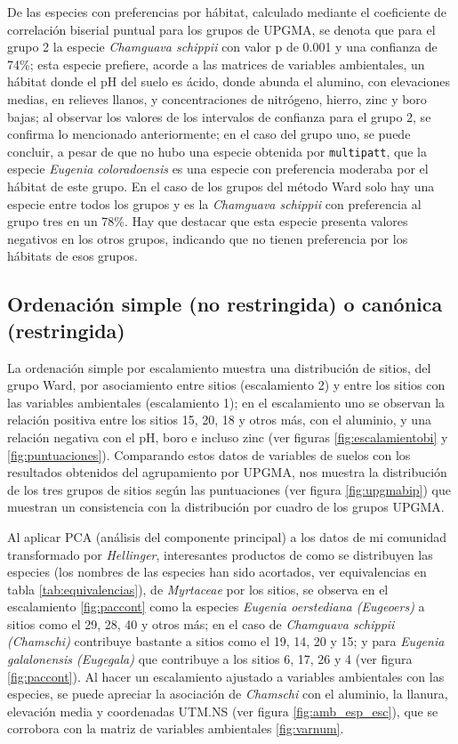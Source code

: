 \documentclass[11pt,]{article}
\begin{document}
De las especies con preferencias por hábitat, calculado mediante el
coeficiente de correlación biserial puntual para los grupos de UPGMA, se
denota que para el grupo 2 la especie \emph{Chamguava schippii} con
valor p de 0.001 y una confianza de 74\%; esta especie prefiere, acorde
a las matrices de variables ambientales, un hábitat donde el pH del
suelo es ácido, donde abunda el alumino, con elevaciones medias, en
relieves llanos, y concentraciones de nitrógeno, hierro, zinc y boro
bajas; al observar los valores de los intervalos de confianza para el
grupo 2, se confirma lo mencionado anteriormente; en el caso del grupo
uno, se puede concluir, a pesar de que no hubo una especie obtenida por
\texttt{multipatt}, que la especie \emph{Eugenia coloradoensis} es una
especie con preferencia moderaba por el hábitat de este grupo. En el
caso de los grupos del método Ward solo hay una especie entre todos los
grupos y es la \emph{Chamguava schippii} con preferencia al grupo tres
en un 78\%. Hay que destacar que esta especie presenta valores negativos
en los otros grupos, indicando que no tienen preferencia por los
hábitats de esos grupos.

\subsection{Ordenación simple (no restringida) o canónica
(restringida)}\label{ordenaciuxf3n-simple-no-restringida-o-canuxf3nica-restringida}

La ordenación simple por escalamiento muestra una distribución de
sitios, del grupo Ward, por asociamiento entre sitios (escalamiento 2) y
entre los sitios con las variables ambientales (escalamiento 1); en el
escalamiento uno se observan la relación positiva entre los sitios 15,
20, 18 y otros más, con el aluminio, y una relación negativa con el pH,
boro e incluso zinc (ver figuras \ref{fig:escalamientobi} y
\ref{fig:puntuaciones}). Comparando estos datos de variables de suelos
con los resultados obtenidos del agrupamiento por UPGMA, nos muestra la
distribución de los tres grupos de sitios según las puntuaciones (ver
figura \ref{fig:upgmabip}) que muestran un consistencia con la
distribución por cuadro de los grupos UPGMA.

Al aplicar PCA (análisis del componente principal) a los datos de mi
comunidad transformado por \emph{Hellinger}, interesantes productos de
como se distribuyen las especies (los nombres de las especies han sido
acortados, ver equivalencias en tabla \ref{tab:equivalencias}), de
\emph{Myrtaceae} por los sitios, se observa en el escalamiento
\ref{fig:paccont} como la especies \emph{Eugenia oerstediana (Eugeoers)}
a sitios como el 29, 28, 40 y otros más; en el caso de \emph{Chamguava
schippii (Chamschi)} contribuye bastante a sitios como el 19, 14, 20 y
15; y para \emph{Eugenia galalonensis (Eugegala)} que contribuye a los
sitios 6, 17, 26 y 4 (ver figura \ref {fig:paccont}). Al hacer un
escalamiento ajustado a variables ambientales con las especies, se puede
apreciar la asociación de \emph{Chamschi} con el aluminio, la llanura,
elevación media y coordenadas UTM.NS (ver figura \ref{fig:amb_esp_esc}),
que se corrobora con la matriz de variables ambientales
\ref {fig:varnum}.
\end{document}
